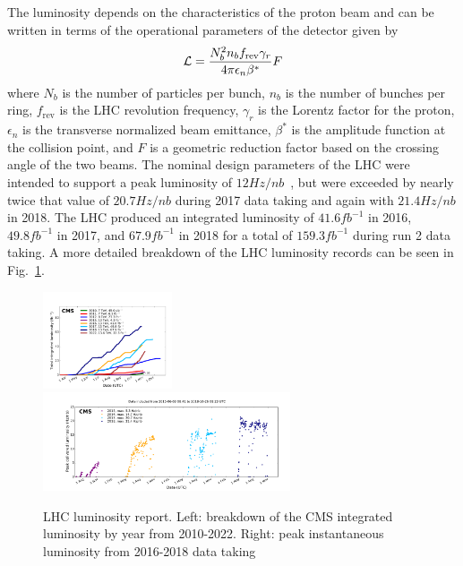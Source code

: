 The luminosity depends on the characteristics of the proton beam and can be written in terms of the operational parameters of the detector given by
\begin{equation}
	\mathcal{L}=\frac{N_b^2n_bf_\mathrm{rev}\gamma_r}{4\pi\epsilon_n\beta^*}F
\end{equation}
where $N_b$ is the number of particles per bunch, $n_b$ is the number of bunches per ring, $f_\mathrm{rev}$ is the LHC revolution frequency, $\gamma_r$ is the Lorentz factor for the proton, $\epsilon_n$ is the transverse normalized beam emittance, $\beta^*$ is the amplitude function at the collision point, and $F$ is a geometric reduction factor based on the crossing angle of the two beams. The nominal design parameters of the LHC were intended to support a peak luminosity of $12\unit{Hz/nb}$~\cite{Bruning:782076}, but were exceeded by nearly twice that value of $20.7\unit{Hz/nb}$ during 2017 data taking and again with $21.4\unit{Hz/nb}$ in 2018. The LHC produced an integrated luminosity of $41.6\unit{fb^{-1}}$ in 2016, $49.8\unit{fb^{-1}}$ in 2017, and $67.9\unit{fb^{-1}}$ in 2018 for a total of $159.3\unit{fb^{-1}}$ during run 2 data taking. A more detailed breakdown of the LHC luminosity records can be seen in Fig.~\ref{fig:LHC_lumi}.

\begin{figure}[!htbp]
	\centering
	\includegraphics[width=0.34\textwidth]{figs/03_experiment/int_lumi_cumulative_pp_2.pdf}
	\includegraphics[width=0.65\textwidth]{figs/03_experiment/peak_lumi_pp_run2.pdf}
	\caption[LHC luminosity report. Left: breakdown of the CMS integrated luminosity by year from 2010-2022. Right:  peak luminosity from 2016-2018 data taking~\cite{CMSlumi}.]
	{LHC luminosity report. Left: breakdown of the CMS integrated luminosity by year from 2010-2022. Right: peak instantaneous luminosity from 2016-2018 data taking~\cite{CMSlumi}}
	\label{fig:LHC_lumi}
\end{figure}

